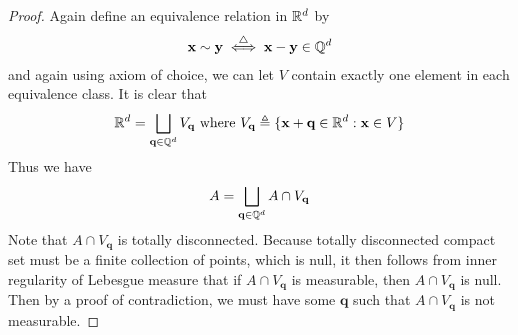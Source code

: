 \documentclass{report}
\begin{document}
\begin{proof}
Again define an equivalence relation in $\mathbb{R}^d$ by 
\begin{align*}
\textbf{x}\sim  \textbf{y}\overset{\triangle}{\iff }\textbf{x}-\textbf{y}\in\mathbb{Q}^d
\end{align*}
and again using axiom of choice, we can let $V$ contain exactly one element in each equivalence class. It is clear that 
\begin{align*}
\mathbb{R}^d=\bigsqcup _{\textbf{q}\in\mathbb{Q}^d}V_{\textbf{q}}\text{ where }V_{\textbf{q}}\triangleq \{ \textbf{x}+\textbf{q}\in\mathbb{R}^d: \textbf{x}\in V \}
\end{align*}
Thus we have 
\begin{align*}
A=\bigsqcup _{\textbf{q}\in\mathbb{Q}^d} A\cap V_{\textbf{q}}
\end{align*}
Note that $A\cap V_{\textbf{q}}$ is totally disconnected. Because totally disconnected compact set must be a finite collection of points, which is null, it then follows from inner regularity of Lebesgue measure that if $A\cap V_{\textbf{q}}$ is measurable, then $A\cap V_{\textbf{q}}$ is null. Then by a proof of contradiction, we must have some $\textbf{q}$ such that $A\cap V_{\textbf{q}}$ is not measurable.
\end{proof}
\end{document}
